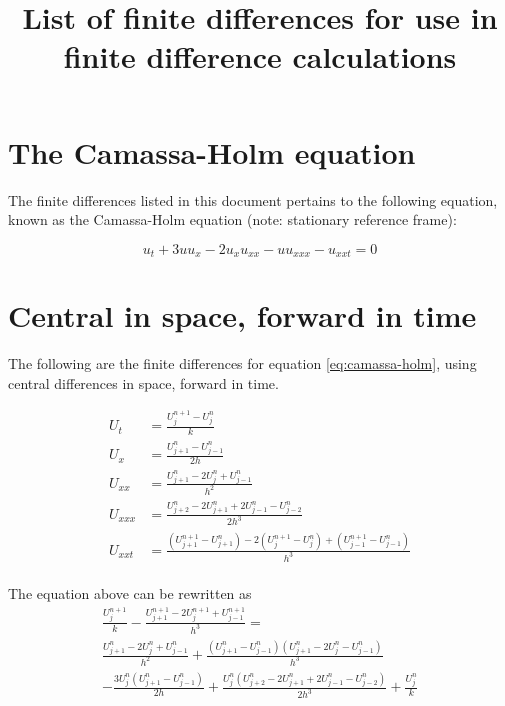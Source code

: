 \documentclass{article}
\begin{document}
\title{List of finite differences for use in finite difference calculations}
\maketitle

\section*{The Camassa-Holm equation}
The finite differences listed in this document pertains to the following equation, known as the Camassa-Holm equation (note: stationary reference frame):

\begin{equation}
\label{eq:camassa-holm}
u_t + 3uu_x - 2u_xu_{xx} - uu_{xxx} - u_{xxt} = 0
\end{equation}

\section*{Central in space, forward in time}
The following are the finite differences for equation \eqref{eq:camassa-holm}, using central differences in space, forward in time.

\begin{align}
U_t &= \frac{U_{j}^{n+1} - U_{j}^{n}}{k} \\
U_x &= \frac{U_{j+1}^n - U_{j-1}^n}{2h} \\
U_{xx} &= \frac{U_{j+1}^n - 2U_j^n + U_{j-1}^n}{h^2} \\
U_{xxx} &= \frac{U_{j+2}^n - 2U_{j+1}^n + 2U_{j-1}^n - U_{j-2}^n}{2h^3} \\
U_{xxt} &= \frac{(U_{j+1}^{n+1} - U_{j+1}^n) - 2(U_j^{n+1} - U_j^n) + (U_{j-1}^{n+1} - U_{j-1}^n)}{h^3}
\end{align}\\

\newpage
The equation above can be rewritten as\\

\begin{align*}
\frac{U_{j}^{n+1}}{k} - \frac{U_{j+1}^{n+1}-2U_{j}^{n+1}+U_{j-1}^{n+1}}{h^{3}} = \\
\frac{U_{j+1}^n - 2U_j^n + U_{j-1}^n}{h^2} +\frac{\left(U_{j+1}^n-U_{j-1}^n\right)\left(U_{j+1}^n-2U_{j}^n-U_{j-1}^n\right)}{h^{3}}\\
-\frac{3U_{j}^n\left(U_{j+1}^n-U_{j-1}^n\right)}{2h} +\frac{U_{j}^n\left(U_{j+2}^n-2U_{j+1}^n+2U_{j-1}^n-U_{j-2}^n\right)}{2h^{3}} +\frac{U_{j}^n}{k}\\
\end{align*}\\
\end{document}
